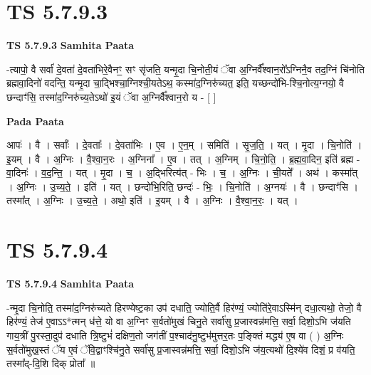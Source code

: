 \documentclass[17pt]{extarticle}
\begin{document}
\section*{ TS 5.7.9.3 }

\textbf{TS 5.7.9.3 } \newline
\textbf{Samhita Paata} \newline

-त्यापो॒ वै सर्वा॑ दे॒वता॑ दे॒वता॑भिरे॒वैनꣳ॒॒ सꣳ सृ॑जति॒ यन्मृ॒दा चि॒नोती॒यं ॅवा अ॒ग्निर्वै᳚श्वान॒रो᳚ऽग्निनै॒व तद॒ग्निं चि॑नोति ब्रह्मवा॒दिनो॑ वदन्ति॒ यन्मृ॒दा चा॒द्भिश्चा॒ग्निश्ची॒यतेऽथ॒ कस्मा॑द॒ग्निरु॑च्यत॒ इति॒ यच्छन्दो॑भि-श्चि॒नोत्य॒ग्नयो॒ वै छन्दाꣳ॑सि॒ तस्मा॑द॒ग्निरु॑च्य॒तेऽथो॑ इ॒यं ॅवा अ॒ग्निर्वै᳚श्वान॒रो य - [  ] \newline

\textbf{Pada Paata} \newline

आपः॑ । वै । सर्वाः᳚ । दे॒वताः᳚ । दे॒वता॑भिः । ए॒व । ए॒न॒म् । समिति॑ । सृ॒ज॒ति॒ । यत् । मृ॒दा । चि॒नोति॑ । इ॒यम् । वै । अ॒ग्निः । वै॒श्वा॒न॒रः । अ॒ग्निना᳚ । ए॒व । तत् । अ॒ग्निम् । चि॒नो॒ति॒ । ब्र॒ह्म॒वा॒दिन॒ इति॑ ब्रह्म - वा॒दिनः॑ । व॒द॒न्ति॒ । यत् । मृ॒दा । च॒ । अ॒द्भिरित्य॑त् - भिः । च॒ । अ॒ग्निः । ची॒यते᳚ । अथ॑ । कस्मा᳚त् । अ॒ग्निः । उ॒च्य॒ते॒ । इति॑ । यत् । छन्दो॑भि॒रिति॒ छन्दः॑ - भिः॒ । चि॒नोति॑ । अ॒ग्नयः॑ । वै । छन्दाꣳ॑सि । तस्मा᳚त् । अ॒ग्निः । उ॒च्य॒ते॒ । अथो॒ इति॑ । इ॒यम् । वै । अ॒ग्निः । वै॒श्वा॒न॒रः॒ । यत् ।  \newline




\section*{ TS 5.7.9.4 }

\textbf{TS 5.7.9.4 } \newline
\textbf{Samhita Paata} \newline

-न्मृ॒दा चि॒नोति॒ तस्मा॑द॒ग्निरु॑च्यते हिरण्येष्ट॒का उप॑ दधाति॒ ज्योति॒र्वै हिर॑ण्यं॒ ज्योति॑रे॒वाऽस्मि॑न् दधा॒त्यथो॒ तेजो॒ वै हिर॑ण्यं॒ तेज॑ ए॒वाऽऽ*त्मन् ध॑त्ते॒ यो वा अ॒ग्निꣳ स॒र्वतो॑मुखं चिनु॒ते सर्वा॑सु प्र॒जास्वन्न॑मत्ति॒ सर्वा॒ दिशो॒ऽभि ज॑यति गाय॒त्रीं पु॒रस्ता॒दुप॑ दधाति त्रि॒ष्टुभं॑ दक्षिण॒तो जग॑तीं प॒श्चाद॑नु॒ष्टुभ॑मुत्तर॒तः प॒ङ्क्तिं मद्ध्य॑ ए॒ष वा ( ) अ॒ग्निः स॒र्वतो॑मुख॒स्तं ॅय ए॒वं ॅवि॒द्वाꣳश्चि॑नु॒ते सर्वा॑सु प्र॒जास्वन्न॑मत्ति॒ सर्वा॒ दिशो॒ऽभि ज॑य॒त्यथो॑ दि॒श्ये॑व दिशं॒ प्र व॑यति॒ तस्मा᳚द्-दि॒शि दिक् प्रोता᳚ ॥ \newline
\end{document}
